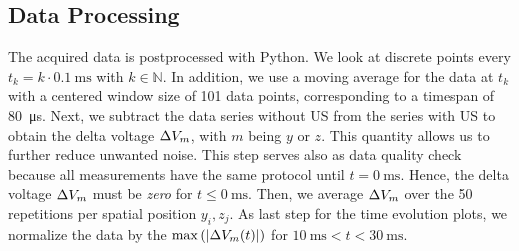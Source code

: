 \subsection{Data Processing}

The acquired data is postprocessed with Python. We look at discrete points 
every $t_{k} = k\cdot\SI{0.1}{\ms}$ with $k\in \mathbb{N}$. In addition, we use 
a moving average for the data at $t_{k}$ with a centered window size of 101 
data points, corresponding to a timespan of \SI{80}{\us}. Next, we subtract the 
data series without US from the series with US to obtain the delta voltage 
$\Delta V_{m}$, with $m$ being $y$ or $z$. This quantity allows us to further reduce 
unwanted noise. This step serves also as data quality check because all 
measurements have the same protocol until $t=\SI{0}{\ms}$. Hence, the delta 
voltage $\Delta V_{m}$ must be \emph{zero} for $t\leq\SI{0}{\ms}$. Then, we average 
$\Delta V_{m}$ over the 50 repetitions per spatial position $y_{i}, z_{j}$. As last 
step for the time evolution plots, we normalize the data by the $\max\left( 
\left\vert \Delta V_{m}(t)\right\vert \right)$ for $\SI{10}{\ms} < t < 
\SI{30}{\ms}$.
